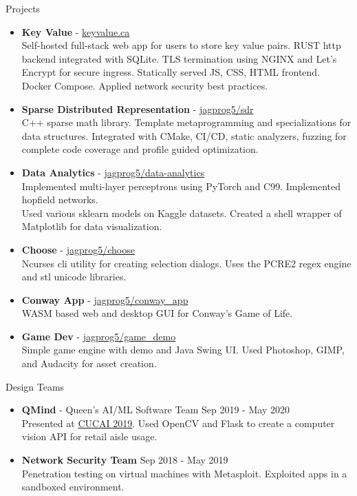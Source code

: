 \documentclass{resume} %
\begin{document}
\begin{rSection}{Projects}
    \begin{itemize}
        \item {\bf Key Value} - \href{http://www.keyvalue.ca/}{keyvalue.ca}\\
        Self-hosted full-stack web app for users to store key value pairs. RUST http backend integrated with SQLite. TLS termination using NGINX and Let's Encrypt for secure ingress.
        Statically served JS, CSS, HTML frontend. Docker Compose. Applied network security best practices.
        \item {\bf Sparse Distributed Representation} - \href{https://github.com/jagprog5/SDR/}{jagprog5/sdr}\\
        C++ sparse math library. Template metaprogramming and specializations for data structures. Integrated with CMake, CI/CD, static analyzers, fuzzing for complete code coverage and profile guided optimization.
        \item {\bf Data Analytics} - \href{https://github.com/jagprog5/resume/blob/main/data-analytics-projects.md}{jagprog5/data-analytics}\\
        Implemented multi-layer perceptrons using PyTorch and C99. Implemented hopfield networks.\\
        Used various sklearn models on Kaggle datasets. Created a shell wrapper of Matplotlib for data visualization. 
        \item {\bf Choose} - \href{https://github.com/jagprog5/choose/}{jagprog5/choose}\\
        Ncurses cli utility for creating selection dialogs. Uses the PCRE2 regex engine and stl unicode libraries.
        \item {\bf Conway App} - \href{https://github.com/jagprog5/conway_app/}{jagprog5/conway\_app}\\
        WASM based web and desktop GUI for Conway's Game of Life.
        \item {\bf Game Dev} - \href{https://github.com/jagprog5/GameDemo}{jagprog5/game\_demo}\\
        Simple game engine with demo and Java Swing UI. Used Photoshop, GIMP, and Audacity for asset creation.
    \end{itemize}
\end{rSection}

\begin{rSection}{Design Teams}
    \begin{itemize}
        \item {\bf QMind} - Queen's AI/ML Software Team \hfill {Sep 2019 - May 2020}\\
        Presented at \href{https://medium.com/qmind-ai/cucai2019-c9d5f848f5c}{CUCAI 2019}. Used OpenCV and Flask to create a computer vision API for retail aisle usage.
        \item {\bf Network Security Team} \hfill {Sep 2018 - May 2019}\\
        Penetration testing on virtual machines with Metasploit. Exploited apps in a sandboxed environment.
\end{itemize}
\end{rSection}
\end{document}
